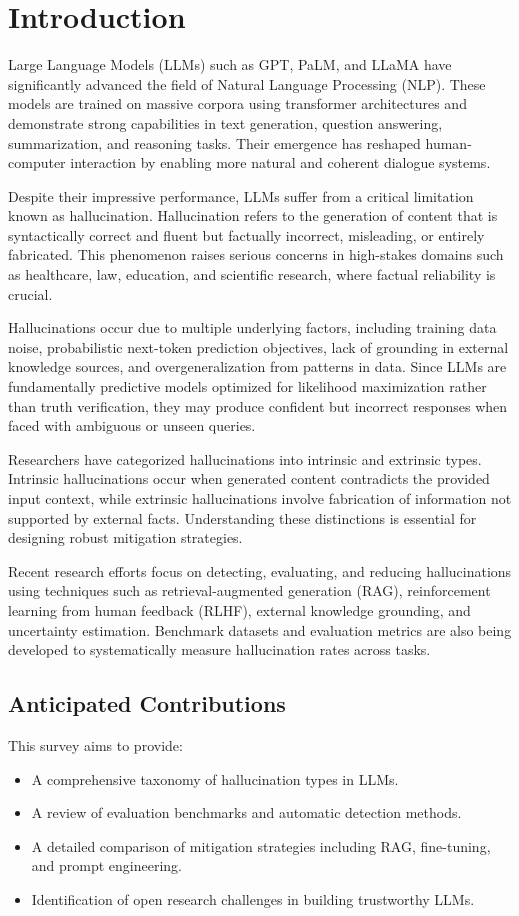 \section{Introduction}

Large Language Models (LLMs) such as GPT, PaLM, and LLaMA have significantly advanced the field of Natural Language Processing (NLP). These models are trained on massive corpora using transformer architectures and demonstrate strong capabilities in text generation, question answering, summarization, and reasoning tasks. Their emergence has reshaped human-computer interaction by enabling more natural and coherent dialogue systems.

Despite their impressive performance, LLMs suffer from a critical limitation known as hallucination. Hallucination refers to the generation of content that is syntactically correct and fluent but factually incorrect, misleading, or entirely fabricated. This phenomenon raises serious concerns in high-stakes domains such as healthcare, law, education, and scientific research, where factual reliability is crucial.

Hallucinations occur due to multiple underlying factors, including training data noise, probabilistic next-token prediction objectives, lack of grounding in external knowledge sources, and overgeneralization from patterns in data. Since LLMs are fundamentally predictive models optimized for likelihood maximization rather than truth verification, they may produce confident but incorrect responses when faced with ambiguous or unseen queries.

Researchers have categorized hallucinations into intrinsic and extrinsic types. Intrinsic hallucinations occur when generated content contradicts the provided input context, while extrinsic hallucinations involve fabrication of information not supported by external facts. Understanding these distinctions is essential for designing robust mitigation strategies.

Recent research efforts focus on detecting, evaluating, and reducing hallucinations using techniques such as retrieval-augmented generation (RAG), reinforcement learning from human feedback (RLHF), external knowledge grounding, and uncertainty estimation. Benchmark datasets and evaluation metrics are also being developed to systematically measure hallucination rates across tasks.

\subsection*{Anticipated Contributions}

This survey aims to provide:

\begin{itemize}
    \item A comprehensive taxonomy of hallucination types in LLMs.
    \item A review of evaluation benchmarks and automatic detection methods.
    \item A detailed comparison of mitigation strategies including RAG, fine-tuning, and prompt engineering.
    \item Identification of open research challenges in building trustworthy LLMs.
\end{itemize}
